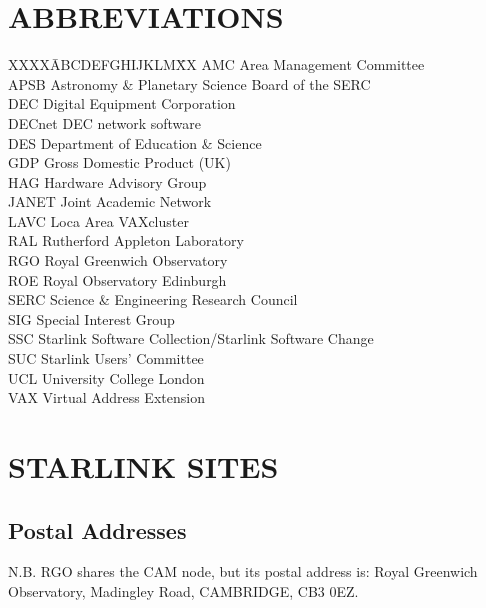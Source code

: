 \begin{itemize}
\end{itemize}

\newpage

\appendix

\section {ABBREVIATIONS}

\begin{tabbing}
XXXX\=ABCDEFGHIJKLM\=XX\kill
\>AMC \>Area Management Committee\\
\>APSB \>Astronomy \& Planetary Science Board of the SERC\\
\>DEC \>Digital Equipment Corporation\\
\>DECnet \>DEC network software\\
\>DES \>Department of Education \& Science\\
\>GDP \> Gross Domestic Product (UK)\\
\>HAG \> Hardware Advisory Group\\
\>JANET \>Joint Academic Network\\
\>LAVC \>Loca Area VAXcluster\\
\>RAL \>Rutherford Appleton Laboratory\\
\>RGO \>Royal Greenwich Observatory\\
\>ROE \>Royal Observatory Edinburgh\\
\>SERC \>Science \& Engineering Research Council\\
\>SIG \>Special Interest Group\\
\>SSC \>Starlink Software Collection/Starlink Software Change\\
\>SUC \>Starlink Users' Committee\\
\>UCL \>University College London\\
\>VAX \>Virtual Address Extension\\
\end{tabbing}

\section {STARLINK SITES}

\subsection{Postal Addresses}

N.B. RGO shares the CAM node, but its postal address is: Royal Greenwich
Observatory, Madingley Road, CAMBRIDGE, CB3 0EZ.

